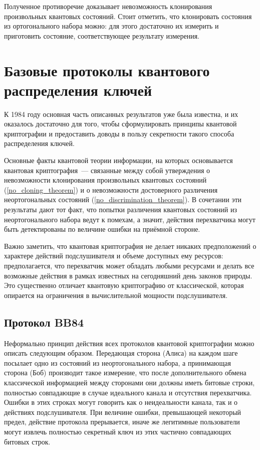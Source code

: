 Полученное противоречие доказывает невозможность клонирования произвольных квантовых состояний. Стоит отметить, что клонировать состояния из ортогонального набора можно: для этого достаточно их измерить и приготовить состояние, соответствующее результату измерения.

\section{Базовые протоколы квантового распределения ключей}
К 1984 году основная часть описанных результатов уже была известна, и их оказалось достаточно для того, чтобы сформулировать принципы квантовой криптографии и предоставить доводы в пользу секретности такого способа распределения ключей. 

Основные факты квантовой теории информации, на которых основывается квантовая криптография~--- связанные между собой утверждения о невозможности клонирования произвольных квантовых состояний (\ref{no_cloning_theorem}) и о невозможности достоверного различения неортогональных состояний (\ref{no_discrimination_theorem}). В сочетании эти результаты дают тот факт, что попытки различения квантовых состояний из неортогонального набора ведут к помехам, а значит, действия перехватчика могут быть детектированы по величине ошибки на приёмной стороне.

Важно заметить, что квантовая криптография не делает никаких предположений о характере действий подслушивателя и объеме доступных ему ресурсов: предполагается, что перехватчик может обладать любыми ресурсами и делать все возможные действия в рамках известных на сегодняшний день законов природы. Это существенно отличает квантовую криптографию от классической, которая опирается на ограничения в вычислительной мощности подслушивателя.

\subsection{Протокол BB84}
Неформально принцип действия всех протоколов квантовой криптографии можно описать следующим образом. Передающая сторона (Алиса) на каждом шаге посылает одно из состояний из неортогонального набора, а принимающая сторона (Боб) производит такое измерение, что после дополнительного обмена классической информацией между сторонами они должны иметь битовые строки, полностью совпадающие в случае идеального канала и отсутствия перехватчика. Ошибки в этих строках могут говорить как о неидеальности канала, так и о действиях подслушивателя. При величине ошибки, превышающей некоторый предел, действие протокола прерывается, иначе же легитимные пользователи могут извлечь полностью секретный ключ из этих частично совпадающих битовых строк.

